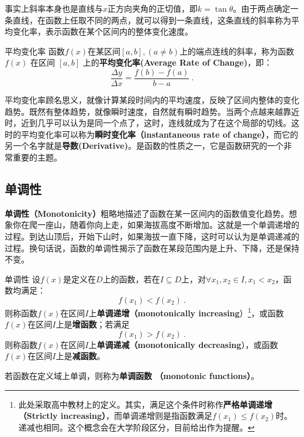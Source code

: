 事实上斜率本身也是直线与$x$正方向夹角的正切值，即$k=\tan\theta$。由于两点确定一条直线，在函数上任取不同的两点，就可以得到一条直线，这条直线的斜率称为平均变化率，表示函数在某个区间内的整体变化速度。

\begin{definition}{平均变化率}
函数$f(x)$在某区间$[a, b],(a\neq b)$上的端点连线的斜率，称为函数 $f(x)$ 在区间 $[a, b]$ 上的\textbf{平均变化率(Average Rate of Change)}，即：
\begin{equation}
\frac{\Delta y}{\Delta x}=\frac{f(b) - f(a)}{b - a}~.
\end{equation}
\end{definition}

平均变化率顾名思义，就像计算某段时间内的平均速度，反映了区间内整体的变化趋势。既然有整体趋势，就像瞬时速度，自然就有瞬时趋势。当两个点越来越靠近时，近到几乎可以认为是同一个点了，这时，连线就成为了在这个局部的切线。这时的平均变化率可以称为\textbf{瞬时变化率（instantaneous rate of change）}，而它的另一个名字就是\textbf{导数(Derivative)}。是函数的性质之一，它是函数研究的一个非常重要的主题。

\subsection{单调性}\label{sub_HsFunC_1}

\textbf{单调性（Monotonicity）}粗略地描述了函数在某一区间内的函数值变化趋势。想象你在爬一座山，随着你向上走，如果海拔高度不断增加。这就是一个单调递增的过程。到达山顶后，开始下山时，如果海拔一直下降，这时可以认为是单调递减的过程。换句话说，函数的单调性揭示了函数在某段范围内是上升、下降，还是保持不变。

\begin{definition}{单调性}\label{def_HsFunC_1}
设$f(x)$是定义在$D$上的函数，若在$I\subseteq D$上，对$\forall x_1,x_2\in I,x_1< x_2$，函数均满足：
\begin{equation}
f(x_1)<f(x_2)~.
\end{equation}
则称函数$f(x)$在区间$I$上\textbf{单调递增（monotonically increasing}）\footnote{此处采取高中教材上的定义。其实，满足这个条件时称作\textbf{严格单调递增 （Strictly increasing）}，而单调递增则是指函数满足$f(x_1)\leq f(x_2)$时。递减也相同。这个概念会在大学阶段区分，目前给出作为提醒。}，或函数$f(x)$在区间$I$上是\textbf{增函数}；若满足
\begin{equation}
f(x_1)>f(x_2)~.
\end{equation}
则称函数$f(x)$在区间$I$上\textbf{单调递减（monotonically decreasing}），或函数$f(x)$在区间$I$上是\textbf{减函数}。

若函数在定义域上单调，则称为\textbf{单调函数 （monotonic functions）}。
\end{definition}

